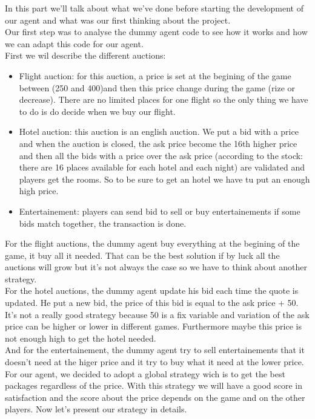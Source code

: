 In this part we'll talk about what we've done before starting the development of our agent and what was our first thinking about the project.\\
Our first step was to analyse the dummy agent code to see how it works and how we can adapt this code for our agent.\\
First we wil describe the different auctions:\\
\begin{itemize}
\item Flight auction: for this auction, a price is set at the begining of the game between (250 and 400)and then this price change during the game (rize or decrease). There are no limited places for one flight so the only thing we have to do is do decide when we buy our flight.
\item Hotel auction: this auction is an english auction. We put a bid with a price and when the auction is closed, the ask price become the 16th higher price and then all the bids with a price over the ask price (according to the stock: there are 16 places available for each hotel and each night) are validated and players get the rooms. So to be sure to get an hotel we have tu put an enough high price.
\item Entertainement: players can send bid to sell or buy entertainements if some bids match together, the transaction is done.
\end{itemize}
For the flight auctions, the dummy agent buy everything at the begining of the game, it buy all it needed. That can be the best solution if by luck all the auctions will grow but it's not always the case so we have to think about another strategy.\\
For the  hotel auctions, the dummy agent update his bid each time the quote is updated. He put a new bid, the price of this bid is equal to the ask price + 50. It's not a really good strategy because 50 is a fix variable and variation of the ask price can be higher or lower in different games. Furthermore maybe this price is not enough high to get the hotel needed.\\
And for the entertainement, the dummy agent try to sell entertainements that it doesn't need at the higer price and it try to buy what it need at the lower price.\\
For our agent, we decided to adopt a global strategy wich is to get the best packages regardless of the price. With this strategy we will have a good score in satisfaction and the score about the price depends on the game and on the other players.
Now let's present our strategy in details.